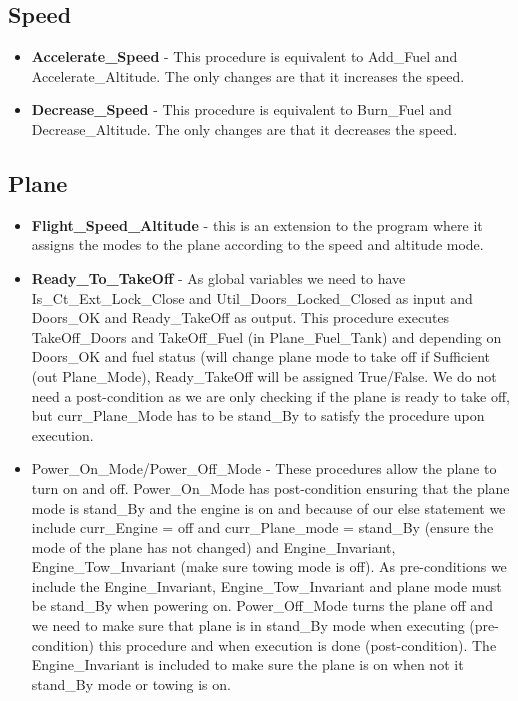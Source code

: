 \documentclass{llncs}
\begin{document}
\subsection{Speed}
\begin{itemize}
\item \textbf{Accelerate\_Speed} - This procedure is equivalent to Add\_Fuel and Accelerate\_Altitude. The only changes are that it increases the speed.
\item \textbf{Decrease\_Speed} - This procedure is equivalent to Burn\_Fuel and Decrease\_Altitude. The only changes are that it decreases the speed.
\end{itemize}
\subsection{Plane}
\begin{itemize}
\item \textbf{Flight\_Speed\_Altitude} - this is an extension to the program where it assigns the modes to the plane according to the speed and altitude mode. 
\item \textbf{Ready\_To\_TakeOff} - As global variables we need to have Is\_Ct\_Ext\_Lock\_Close and  Util\_Doors\_Locked\_Closed as input and  Doors\_OK and Ready\_TakeOff as output. This procedure executes TakeOff\_Doors and TakeOff\_Fuel (in Plane\_Fuel\_Tank) and depending on Doors\_OK and fuel status (will change plane mode to take off if Sufficient (out Plane\_Mode), Ready\_TakeOff will be assigned True/False. We do not need a post-condition as we are only checking if the plane is ready to take off, but curr\_Plane\_Mode has to be stand\_By to satisfy the procedure upon execution. 
\item {Power\_On\_Mode/Power\_Off\_Mode} -  These procedures allow the plane to turn on and off. Power\_On\_Mode has post-condition ensuring that the plane mode is stand\_By and the engine is on and because of our else statement we include curr\_Engine = off and curr\_Plane\_mode = stand\_By (ensure the mode of the plane has not changed) and Engine\_Invariant, Engine\_Tow\_Invariant (make sure towing mode is off). As pre-conditions we include the Engine\_Invariant, Engine\_Tow\_Invariant and plane mode must be stand\_By when powering on.  Power\_Off\_Mode turns the plane off and we need to make sure that plane is in stand\_By mode when executing (pre-condition) this procedure and when execution is done (post-condition). The Engine\_Invariant is included to make sure the plane is on when not it stand\_By mode or towing is on. 
\end{itemize}
\end{document}
